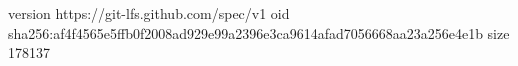 version https://git-lfs.github.com/spec/v1
oid sha256:af4f4565e5ffb0f2008ad929e99a2396e3ca9614afad7056668aa23a256e4e1b
size 178137
